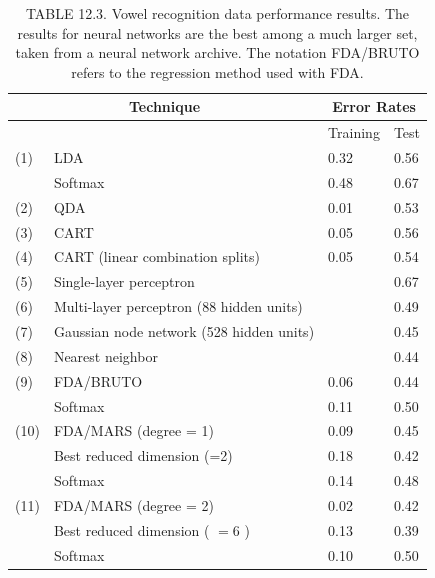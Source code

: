 \documentclass[10pt]{article}
\begin{document}
\begin{table}[h]
\begin{center}
\captionsetup{labelformat=empty}
\caption{TABLE 12.3. Vowel recognition data performance results. The results for neural networks are the best among a much larger set, taken from a neural network archive. The notation FDA/BRUTO refers to the regression method used with FDA.}
\begin{tabular}{|l|l|l|l|}
\hline
\multicolumn{2}{|c|}{\multirow[t]{2}{*}{Technique}} & \multicolumn{2}{|c|}{Error Rates} \\
\hline
 &  & Training & Test \\
\hline
(1) & LDA & 0.32 & 0.56 \\
\hline
 & Softmax & 0.48 & 0.67 \\
\hline
(2) & QDA & 0.01 & 0.53 \\
\hline
(3) & CART & 0.05 & 0.56 \\
\hline
(4) & CART (linear combination splits) & 0.05 & 0.54 \\
\hline
(5) & Single-layer perceptron &  & 0.67 \\
\hline
(6) & Multi-layer perceptron (88 hidden units) &  & 0.49 \\
\hline
(7) & Gaussian node network (528 hidden units) &  & 0.45 \\
\hline
(8) & Nearest neighbor &  & 0.44 \\
\hline
(9) & FDA/BRUTO & 0.06 & 0.44 \\
\hline
 & Softmax & 0.11 & 0.50 \\
\hline
(10) & FDA/MARS (degree = 1) & 0.09 & 0.45 \\
\hline
 & Best reduced dimension (=2) & 0.18 & 0.42 \\
\hline
 & Softmax & 0.14 & 0.48 \\
\hline
(11) & FDA/MARS (degree = 2) & 0.02 & 0.42 \\
\hline
 & Best reduced dimension ( $=6$ ) & 0.13 & 0.39 \\
\hline
 & Softmax & 0.10 & 0.50 \\
\hline
\end{tabular}
\end{center}
\end{table}
\end{document}
